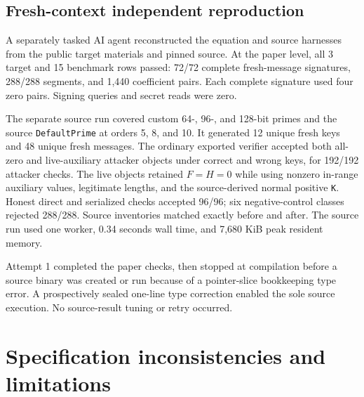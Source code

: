\documentclass[10pt,a4paper]{article}
\begin{document}
\subsection{Fresh-context independent reproduction}

A separately tasked AI agent reconstructed the equation and source harnesses
from the public target materials and pinned source. At the paper level, all 3
target and 15 benchmark rows passed: 72/72 complete fresh-message signatures,
288/288 segments, and 1,440 coefficient pairs. Each complete signature used
four zero pairs. Signing queries and secret reads were zero.

The separate source run covered custom 64-, 96-, and 128-bit primes and the
source \texttt{DefaultPrime} at orders 5, 8, and 10. It generated 12 unique
fresh keys and 48 unique fresh messages. The ordinary exported verifier
accepted both all-zero and live-auxiliary attacker objects under correct and
wrong keys, for 192/192 attacker checks. The live objects retained $F=H=0$
while using nonzero in-range auxiliary values, legitimate lengths, and the
source-derived normal positive \texttt{K}. Honest direct and serialized checks
accepted 96/96; six negative-control classes rejected 288/288. Source
inventories matched exactly before and after. The source run used one worker,
0.34 seconds wall time, and 7,680 KiB peak resident memory.

Attempt 1 completed the paper checks, then stopped at compilation before a
source binary was created or run because of a pointer-slice bookkeeping type
error. A prospectively sealed one-line type correction enabled the sole source
execution. No source-result tuning or retry occurred.

\section{Specification inconsistencies and limitations}
\end{document}
